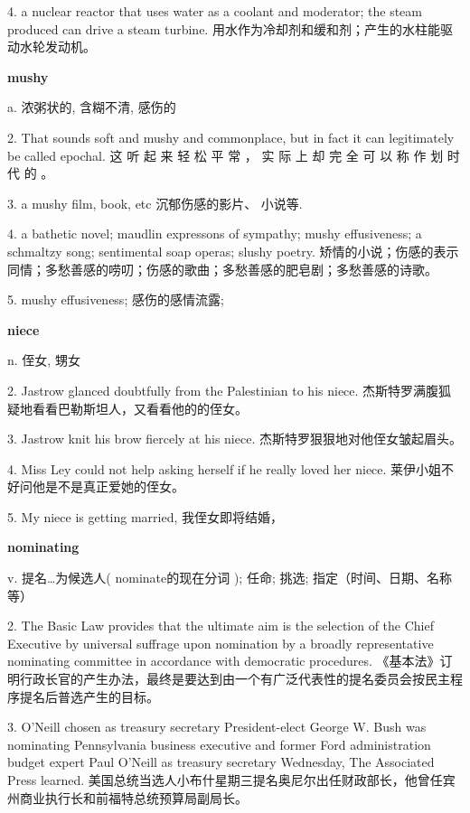 \documentclass[12pt]{book}
\begin{document}
4.  a nuclear reactor that uses water as a coolant and moderator; the steam produced can drive a steam turbine.  用水作为冷却剂和缓和剂；产生的水柱能驱动水轮发动机。 


\vspace{12pt}

\textbf{mushy}

a. 浓粥状的, 含糊不清, 感伤的

2.  That sounds soft and mushy and commonplace, but in fact it can legitimately be called epochal.  这 听 起 来 轻 松 平 常 ， 实 际 上 却 完 全 可 以 称 作 划 时 代 的 。 


3.  a mushy film, book, etc  沉郁伤感的影片、 小说等. 


4.  a bathetic novel; maudlin expressons of sympathy; mushy effusiveness; a schmaltzy song; sentimental soap operas; slushy poetry.  矫情的小说；伤感的表示同情；多愁善感的唠叨；伤感的歌曲；多愁善感的肥皂剧；多愁善感的诗歌。 


5.  mushy effusiveness;  感伤的感情流露; 


\vspace{12pt}

\textbf{niece}

n. 侄女, 甥女

2.  Jastrow glanced doubtfully from the Palestinian to his niece.  杰斯特罗满腹狐疑地看看巴勒斯坦人，又看看他的的侄女。 


3.  Jastrow knit his brow fiercely at his niece.  杰斯特罗狠狠地对他侄女皱起眉头。 


4.  Miss Ley could not help asking herself if he really loved her niece.  莱伊小姐不好问他是不是真正爱她的侄女。 


5.  My niece is getting married,  我侄女即将结婚， 


\vspace{12pt}

\textbf{nominating}

v. 提名…为候选人( nominate的现在分词 ); 任命; 挑选; 指定（时间、日期、名称等）

2.  The Basic Law provides that the ultimate aim is the selection of the Chief Executive by universal suffrage upon nomination by a broadly representative nominating committee in accordance with democratic procedures.  《基本法》订明行政长官的产生办法，最终是要达到由一个有广泛代表性的提名委员会按民主程序提名后普选产生的目标。 


3.  O'Neill chosen as treasury secretary President-elect George W. Bush was nominating Pennsylvania business executive and former Ford administration budget expert Paul O'Neill as treasury secretary Wednesday, The Associated Press learned.  美国总统当选人小布什星期三提名奥尼尔出任财政部长，他曾任宾州商业执行长和前福特总统预算局副局长。 
\end{document}
